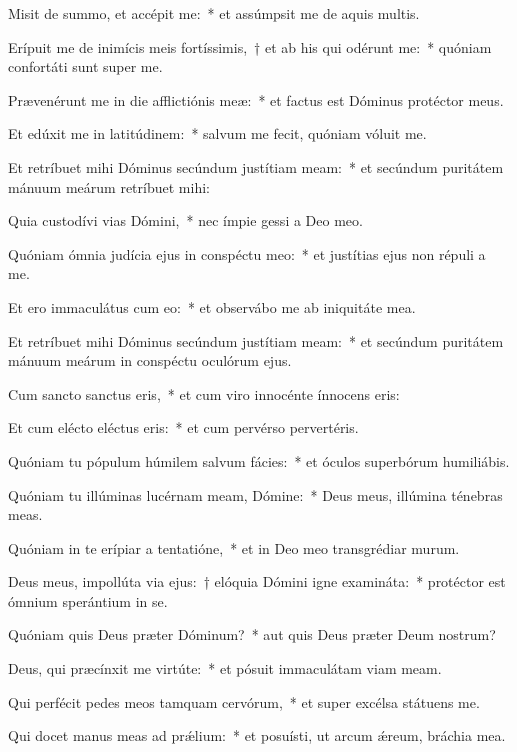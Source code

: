 
\item Misit de summo, et accépit me:~* et assúmpsit me de aquis multis.

\item Erípuit me de inimícis meis fortíssimis,~† et ab his qui odérunt me:~* quóniam confortáti sunt super me.

\item Prævenérunt me in die afflictiónis meæ:~* et factus est Dóminus protéctor meus.

\item Et edúxit me in latitúdinem:~* salvum me fecit, quóniam vóluit me.

\item Et retríbuet mihi Dóminus secúndum justítiam meam:~* et secúndum puritátem mánuum meárum retríbuet mihi:

\item Quia custodívi vias Dómini,~* nec ímpie gessi a Deo meo.

\item Quóniam ómnia judícia ejus in conspéctu meo:~* et justítias ejus non répuli a me.

\item Et ero immaculátus cum eo:~* et observábo me ab iniquitáte mea.

\item Et retríbuet mihi Dóminus secúndum justítiam meam:~* et secúndum puritátem mánuum meárum in conspéctu oculórum ejus.

\item Cum sancto sanctus eris,~* et cum viro innocénte ínnocens eris:

\item Et cum elécto eléctus eris:~* et cum pervérso pervertéris.

\item Quóniam tu pópulum húmilem salvum fácies:~* et óculos superbórum humiliábis.

\item Quóniam tu illúminas lucérnam meam, Dómine:~* Deus meus, illúmina ténebras meas.

\item Quóniam in te erípiar a tentatióne,~* et in Deo meo transgrédiar murum.

\item Deus meus, impollúta via ejus:~† elóquia Dómini igne examináta:~* protéctor est ómnium sperántium in se.

\item Quóniam quis Deus præter Dóminum?~* aut quis Deus præter Deum nostrum?

\item Deus, qui præcínxit me virtúte:~* et pósuit immaculátam viam meam.

\item Qui perfécit pedes meos tamquam cervórum,~* et super excélsa státuens me.

\item Qui docet manus meas ad prǽlium:~* et posuísti, ut arcum ǽreum, bráchia mea.
